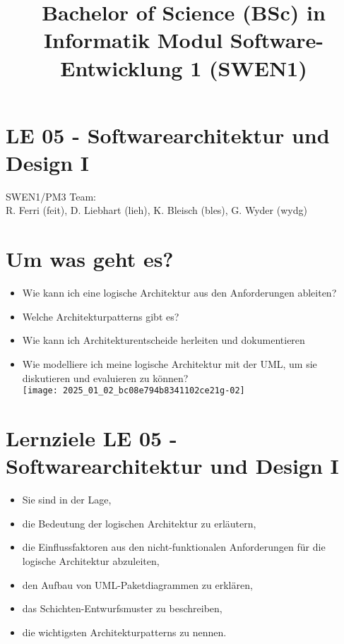 \documentclass[10pt]{article}
\title{Bachelor of Science (BSc) in Informatik Modul Software-Entwicklung 1 (SWEN1) }
\author{}
\date{}
\begin{document}
\maketitle
\section*{LE 05 - Softwarearchitektur und Design I}
SWEN1/PM3 Team:\\
R. Ferri (feit), D. Liebhart (lieh), K. Bleisch (bles), G. Wyder (wydg)

\section*{Um was geht es?}
\begin{itemize}
  \item Wie kann ich eine logische Architektur aus den Anforderungen ableiten?
  \item Welche Architekturpatterns gibt es?
  \item Wie kann ich Architekturentscheide herleiten und dokumentieren
  \item Wie modelliere ich meine logische Architektur mit der UML, um sie diskutieren und evaluieren zu können?\\
\texttt{[image: 2025\_01\_02\_bc08e794b8341102ce21g-02]}
\end{itemize}

\section*{Lernziele LE 05 - Softwarearchitektur und Design I}
\begin{itemize}
  \item Sie sind in der Lage,
  \item die Bedeutung der logischen Architektur zu erläutern,
  \item die Einflussfaktoren aus den nicht-funktionalen Anforderungen für die logische Architektur abzuleiten,
  \item den Aufbau von UML-Paketdiagrammen zu erklären,
  \item das Schichten-Entwurfsmuster zu beschreiben,
  \item die wichtigsten Architekturpatterns zu nennen.
\end{itemize}
\end{document}
